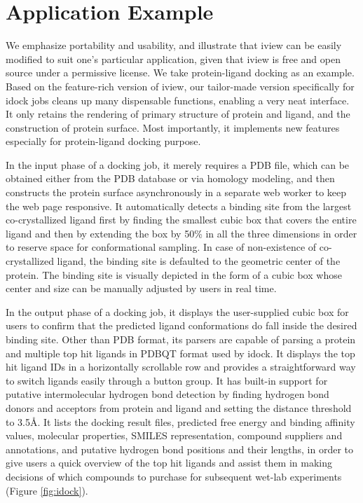 \documentclass[twocolumn]{bmcart}%
\begin{document}
\section*{Application Example}
We emphasize portability and usability, and illustrate that iview can be easily modified to suit one's particular application, given that iview is free and open source under a permissive license. We take protein-ligand docking as an example. Based on the feature-rich version of iview, our tailor-made version specifically for idock jobs cleans up many dispensable functions, enabling a very neat interface. It only retains the rendering of primary structure of protein and ligand, and the construction of protein surface. Most importantly, it implements new features especially for protein-ligand docking purpose.

In the input phase of a docking job, it merely requires a PDB file, which can be obtained either from the PDB database \cite{1357} or via homology modeling, and then constructs the protein surface asynchronously in a separate web worker to keep the web page responsive. It automatically detects a binding site from the largest co-crystallized ligand first by finding the smallest cubic box that covers the entire ligand and then by extending the box by 50\% in all the three dimensions in order to reserve space for conformational sampling. In case of non-existence of co-crystallized ligand, the binding site is defaulted to the geometric center of the protein. The binding site is visually depicted in the form of a cubic box whose center and size can be manually adjusted by users in real time.

In the output phase of a docking job, it displays the user-supplied cubic box for users to confirm that the predicted ligand conformations do fall inside the desired binding site. Other than PDB format, its parsers are capable of parsing a protein and multiple top hit ligands in PDBQT format used by idock. It displays the top hit ligand IDs in a horizontally scrollable row and provides a straightforward way to switch ligands easily through a button group. It has built-in support for putative intermolecular hydrogen bond detection by finding hydrogen bond donors and acceptors from protein and ligand and setting the distance threshold to 3.5\AA. It lists the docking result files, predicted free energy and binding affinity values, molecular properties, SMILES representation, compound suppliers and annotations, and putative hydrogen bond positions and their lengths, in order to give users a quick overview of the top hit ligands and assist them in making decisions of which compounds to purchase for subsequent wet-lab experiments (Figure \ref{fig:idock}).
\end{document}
